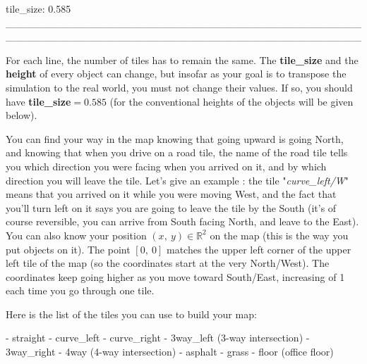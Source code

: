\documentclass[12pt]{article}
\begin{document}
\noindent tile\_size: 0.585\newline
\_\_\_\_\_\_\_\_\_\_\_\_\_\_\_\_\_\_\_\_\_\_\_\_\_\_\_\_\_\_\_\_\_\_\_\_\_\_\_\_\_\_\_\_\_\_\_\_\_\_\_\_\_\_\_\_\_\_\_\_\_\_\_\_\_\_\_\_\_\_\_\_\_\_\_\_\_\_\_\_\_\_\_\_\_\_\_\_\_\_\_\_\_\_\_\_\newline

For each line, the number of tiles has to remain the same. The \textbf{tile\_size} and the \textbf{height} of every object can change, but insofar as your goal is to transpose the simulation to the real world, you must not change their values. If so, you should have \textbf{tile\_size}$=0.585$ (for the conventional heights of the objects will be given below).\newline

You can find your way in the map knowing that going upward is going North, and knowing that when you drive on a road tile, the name of the road tile tells you which direction you were facing when you arrived on it, and by which direction you will leave the tile. Let's give an example : the tile "\textit{curve\_left/W}" means that you arrived on it while you were moving West, and the fact that you'll turn left on it says you are going to leave the tile by the South (it's of course reversible, you can arrive from South facing North, and leave to the East).\newline
You can also know your position $(x,\ y)\in\mathbb{R}^2$ on the map (this is the way you put objects on it). The point $[0,\ 0]$ matches the upper left corner of the upper left tile of the map (so the coordinates start at the very North/West). The coordinates keep going higher as you move toward South/East, increasing of 1 each time you go through one tile.\newline

Here is the list of the tiles you can use to build your map:

\noindent- straight\newline
\noindent- curve\_left\newline
\noindent- curve\_right\newline
\noindent- 3way\_left (3-way intersection)\newline
\noindent- 3way\_right\newline
\noindent- 4way (4-way intersection)\newline
\noindent- asphalt\newline
\noindent- grass\newline
\noindent- floor (office floor)\newline
\end{document}
